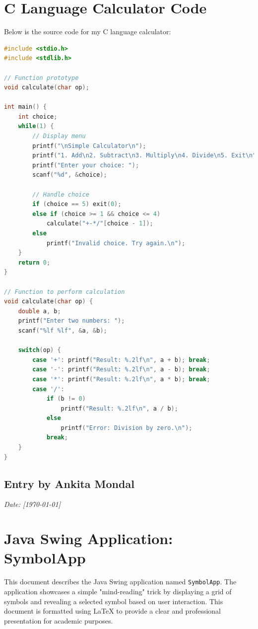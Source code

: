 \documentclass[12pt, a4paper]{article}
\begin{document}
\section*{C Language Calculator Code}
Below is the source code for my C language calculator:
\vspace{0.8cm}
\begin{lstlisting}[language=C, caption=C Calculator Code]
#include <stdio.h>
#include <stdlib.h>

// Function prototype
void calculate(char op);

int main() {
    int choice;
    while(1) {
        // Display menu
        printf("\nSimple Calculator\n");
        printf("1. Add\n2. Subtract\n3. Multiply\n4. Divide\n5. Exit\n");
        printf("Enter your choice: ");
        scanf("%d", &choice);

        // Handle choice
        if (choice == 5) exit(0);
        else if (choice >= 1 && choice <= 4) 
            calculate("+-*/"[choice - 1]);
        else 
            printf("Invalid choice. Try again.\n");
    }
    return 0;
}

// Function to perform calculation
void calculate(char op) {
    double a, b;
    printf("Enter two numbers: ");
    scanf("%lf %lf", &a, &b);

    switch(op) {
        case '+': printf("Result: %.2lf\n", a + b); break;
        case '-': printf("Result: %.2lf\n", a - b); break;
        case '*': printf("Result: %.2lf\n", a * b); break;
        case '/': 
            if (b != 0) 
                printf("Result: %.2lf\n", a / b);
            else 
                printf("Error: Division by zero.\n");
            break;
    }
}

\end{lstlisting}
\newpage
{}
\vspace{-2cm}
\subsection*{Entry by Ankita Mondal}
\textit{Date: [\today]}\\
\section*{Java Swing Application: SymbolApp}
This document describes the Java Swing application named \texttt{SymbolApp}. The application showcases a simple "mind-reading" trick by displaying a grid of symbols and revealing a selected symbol based on user interaction. This document is formatted using LaTeX to provide a clear and professional presentation for academic purposes.
\end{document}
